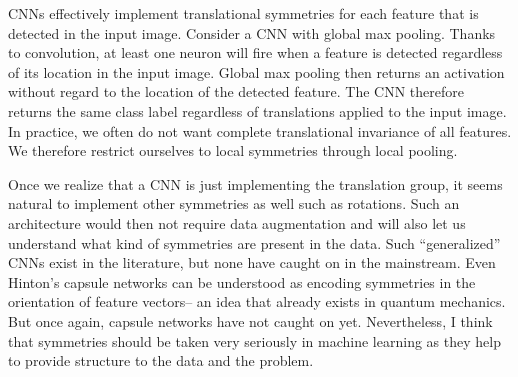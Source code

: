 \documentclass[11pt]{article}
\begin{document}
CNNs effectively implement translational symmetries for each feature that is detected in the input image. Consider a CNN with global max pooling. Thanks to convolution, at least one neuron will fire when a feature is detected regardless of its location in the input image. Global max pooling then returns an activation without regard to the location of the detected feature. The CNN therefore returns the same class label regardless of translations applied to the input image. In practice, we often do not want complete translational invariance of all features. We therefore restrict ourselves to local symmetries through local pooling.

Once we realize that a CNN is just implementing the translation group, it seems natural to implement other symmetries as well such as rotations. Such an architecture would then not require data augmentation and will also let us understand what kind of symmetries are present in the data. Such ``generalized'' CNNs exist in the literature, but none have caught on in the mainstream. Even Hinton's capsule networks can be understood as encoding symmetries in the orientation of feature vectors-- an idea that already exists in quantum mechanics. But once again, capsule networks have not caught on yet. Nevertheless, I think that symmetries should be taken very seriously in machine learning as they help to provide structure to the data and the problem.
\end{document}

